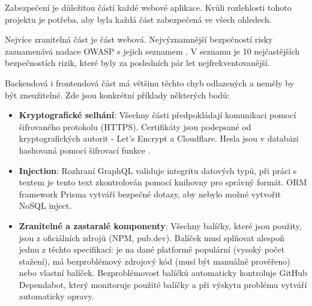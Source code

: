 Zabezpečení je důležitou částí každé webové aplikace. Kvůli rozlehlosti tohoto projektu je potřeba, aby byla každá část zabezpečená ve všech ohledech.\par
Nejvíce zranitelná část je část webová. Nejvýznamnější bezpečností risky zaznamenává nadace OWASP\cite{OWASP} s jejich seznamem \cite{OWASP-top-ten}. V seznamu je 10 nejčastějších bezpečnostích rizik, které byly za posledních pár let nejfrekventovanější.\par
Backendová i frontendová část má většinu těchto chyb odlazených a neměly by být zneužitelné. Zde jsou konkrétní příklady některých bodů:
\begin{itemize}
	\item \textbf{Kryptografické selhání}\cite{CryptographicFailures}: Všechny části předpokládají komunikaci pomocí šifrovaného protokolu (HTTPS). Certifikáty jsou podepsané od kryptografických autorit - Let's Encrypt a Cloudflare. Hesla jsou v databázi hashovaná pomocí šifrovací funkce \cite{bcrypt}.
	\item \textbf{Injection}\cite{Injection}: Rozhraní GraphQL validuje integritu datových typů, při práci s textem je tento text zkontrolován pomocí knihovny \cite{Validator} pro správný formát. ORM framework Prisma vytváří bezpečné dotazy, aby nebylo možné vytvořit NoSQL inject.
	\item \textbf{Zranitelné a zastaralé komponenty}\cite{VulnerableAndOutdatedComponents}: Všechny balíčky, které jsou použity, jsou z oficiálních zdrojů (NPM, pub.dev). Balíček musí splňovat alespoň jednu z těchto specifikací: je na dané platformě populární (vysoký počet stažení), má bezproblémový zdrojový kód (musí být manuálně prověřeno) nebo vlastní balíček. Bezproblémovost balíčků automaticky kontroluje GitHub Dependabot, který monitoruje použité balíčky a při výskytu problému vytváří automaticky opravy.
\end{itemize}
